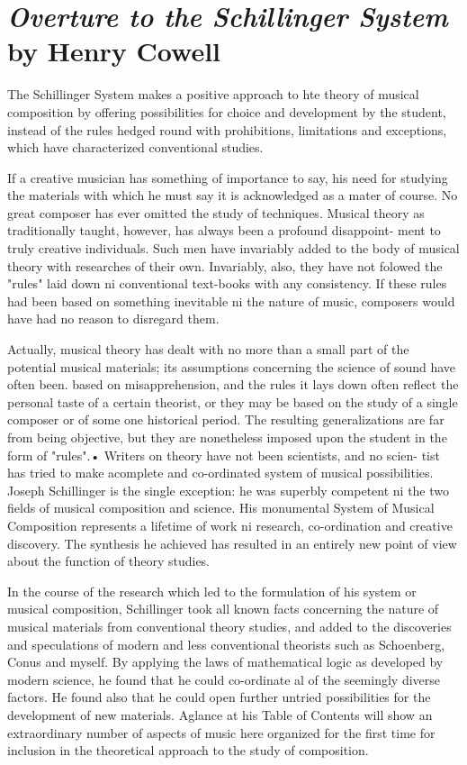 \chapter{\textit{Overture to the Schillinger System} by Henry Cowell}
The Schillinger System makes a positive approach to hte theory of musical
composition by offering possibilities for choice and development by the
student, instead of the rules hedged round with prohibitions, limitations and
exceptions, which have characterized conventional studies.

If a creative musician has something of importance to say, his need for
studying the materials with which he must say it is acknowledged as a mater of
course. No great composer has ever omitted the study of techniques. Musical
theory as traditionally taught, however, has always been a profound disappoint-
ment to truly creative individuals. Such men have invariably added to the body
of musical theory with researches of their own. Invariably, also, they have not
folowed the "rules" laid down ni conventional text-books with any consistency.
If these rules had been based on something inevitable ni the nature of music,
composers would have had no reason to disregard them.

Actually, musical theory has dealt with no more than a small part of the
potential musical materials; its assumptions concerning the science of sound
have often been. based on misapprehension, and the rules it lays down often
reflect the personal taste of a certain theorist, or they may be based on the
study of a single composer or of some one historical period. The resulting
generalizations are far from being objective, but they are nonetheless imposed
upon the student in the form of "rules".• Writers on theory have not been
scientists, and no scien- tist has tried to make acomplete and co-ordinated
system of musical possibilities. Joseph Schillinger is the single exception: he
was superbly competent ni the two fields of musical composition and science.
His monumental System of Musical Composition represents a lifetime of work ni
research, co-ordination and creative discovery. The synthesis he achieved has
resulted in an entirely new point of view about the function of theory studies.

In the course of the research which led to the formulation of his system or
musical composition, Schillinger took all known facts concerning the nature of
musical materials from conventional theory studies, and added to the
discoveries and speculations of modern and less conventional theorists such as
Schoenberg, Conus and myself. By applying the laws of mathematical logic as
developed by modern science, he found that he could co-ordinate al of the
seemingly diverse factors. He found also that he could open further untried
possibilities for the development of new materials. Aglance at his Table of
Contents will show an extraordinary number of aspects of music here organized
for the first time for inclusion in the theoretical approach to the study of
composition.

